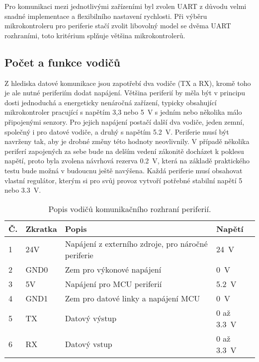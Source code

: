         Pro komunikaci mezi jednotlivými zařízeními byl zvolen UART z důvodu velmi snadné implementace a flexibilního nastavení rychlosti. Při výběru mikrokontroleru pro periferie stačí zvolit libovolný model se dvěma UART rozhraními, toto kritérium splňuje většina mikrokontrolerů.


    \subsection{Počet a funkce vodičů}
        \label{subsec:pocet-a-fce-vodicu-sbernice}
        Z hlediska datové komunikace jsou zapotřebí dva vodiče (TX a RX), kromě toho je ale nutné periferiím dodat napájení. Většina periferií by měla být v principu dosti jednoduchá a energeticky nenáročná zařízení, typicky obsahující mikrokontroler pracující s napětím 3,3 nebo \qty{5}{V} s jedním nebo několika málo připojenými senzory. Pro jejich napájení postačí další dva vodiče, jeden zemní, společný i pro datové vodiče, a druhý s napětím \qty{5.2}{V}. Periferie musí být navrženy tak, aby je drobné změny této hodnoty neovlivnily. V případě několika periferí zapojených za sebe bude na delším vedení zákonitě docházet k poklesu napětí, proto byla zvolena návrhová rezerva \qty{0.2}{V}, která na základě praktického testu bude možná v budoucnu ještě navýšena. Každá periferie musí obsahovat vlastní regulátor, kterým si pro svůj provoz vytvoří potřebné stabilní napětí 5 nebo \qty{3,3}{V}. 
        \begin{table}[h!]
            \centering
            \caption{Popis vodičů komunikačního rozhraní periferií.}
            \label{tab:sbernice-popis-vodicu}
            \begin{tabular}{|l|l|l|l|}
                \hline
                \textbf{Č.} & \textbf{Zkratka} & \textbf{Popis} & \textbf{Napětí} \\
                \hline
                1 & 24V & Napájení z externího zdroje, pro náročné periferie & \qty{24}{V} \\
                \hline
                2 & GND0 & Zem pro výkonové napájení & \qty{0}{V}\\
                \hline
                3 & 5V & Napájení pro MCU periferií & \qty{5.2}{V}\\
                \hline
                4 & GND1 & Zem pro datové linky a napájení MCU & \qty{0}{V}\\
                \hline
                5 & TX & Datový výstup & 0 až \qty{3.3}{V}\\
                \hline
                6 & RX & Datový vstup & 0 až \qty{3.3}{V}\\
                \hline
            \end{tabular}
        \end{table}


